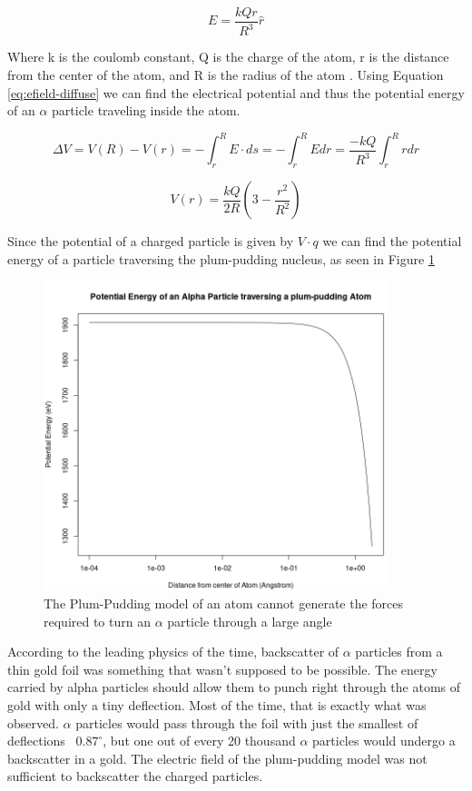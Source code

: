 \documentclass[12pt]{article}
\begin{document}
\begin{equation}\label{eq:efield-diffuse}
    E = \frac{kQr}{R^3}\hat{r}
\end{equation}

Where k is the coulomb constant, Q is the charge of the atom, r is the distance from the center of the atom, and R is the radius of the atom \cite{Rutherford1911}.
Using Equation \ref{eq:efield-diffuse} we can find the electrical potential and thus the potential energy of an $\alpha$ particle traveling inside the atom.

\begin{equation}
    \Delta{V} = V(R)-V(r) = -\int_r^RE\cdot{ds} = -\int_r^RE dr = \frac{-kQ}{R^3}\int_r^Rr dr
\end{equation}

\begin{equation}\label{eq:potential-diffuse}
    V(r) = \frac{kQ}{2R}(3-\frac{r^2}{R^2})
\end{equation}

Since the potential of a charged particle is given by $V\cdot{q}$ we can find the potential energy of a particle traversing the plum-pudding nucleus, as seen in Figure \ref{fig:plumenergy}

\begin{figure}
    \centering
    \includegraphics[width=10cm]{plumenergy}
    \caption{The Plum-Pudding model of an atom cannot generate the forces required to turn an $\alpha$ particle through a large angle}
    \label{fig:plumenergy}
\end{figure}

According to the leading physics of the time, backscatter of $\alpha$ particles from a thin gold foil was something that wasn't supposed to be possible.
The energy carried by alpha particles should allow them to punch right through the atoms of gold with only a tiny deflection.
Most of the time, that is exactly what was observed.
$\alpha$ particles would pass through the foil with just the smallest of deflections ~$0.87^\circ$, but one out of every 20 thousand $\alpha$ particles would undergo a backscatter in a gold\cite{Rutherford1911}.
The electric field of the plum-pudding model was not sufficient to backscatter the charged particles.
\end{document}
